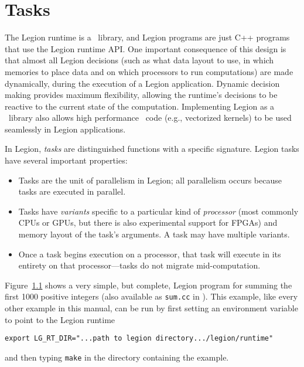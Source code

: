 \chapter{Tasks}
\label{chap:tasks}


The Legion runtime is a \Cpp\ library, and
Legion programs are just C++ programs that use the Legion runtime API.
One important consequence of this design is that almost all Legion decisions
(such as what data layout to use, in which memories to place data and on which
processors to run computations) are made dynamically,  during the execution of 
a Legion application.  Dynamic decision making provides maximum flexibility, 
allowing the runtime's decisions to be reactive to the current state of the computation.
Implementing Legion as a \Cpp\ library also allows high performance \Cpp\ code
(e.g., vectorized kernels) to be used seamlessly in Legion applications.

In Legion, {\em tasks} are distinguished functions with a specific signature.
Legion tasks have several important properties:
\begin{itemize}
\item Tasks are the unit of parallelism in Legion; all parallelism occurs because tasks are executed in parallel.

\item Tasks have {\em variants} specific to a particular kind of {\em processor} (most commonly CPUs or GPUs, but there is also experimental support for FPGAs) and 
memory layout of the task's arguments.  A task may have multiple variants.

\item Once a task begins execution on a processor, that task will execute in its entirety on that processor---tasks do
not migrate mid-computation.  

\end{itemize}


\begin{figure}
  {\small
    
  }
\caption{}
\label{fig:simple}
\end{figure}

Figure~\ref{fig:simple} shows a very simple, but complete, Legion program for summing
the first 1000 positive integers (also available as {\tt sum.cc} in ).
This example, like every other example in this manual, can be run by first setting an environment variable to point to the Legion runtime
\begin{verbatim}
export LG_RT_DIR="...path to legion directory.../legion/runtime"
\end{verbatim}
and then typing {\tt make} in the directory containing the example.


